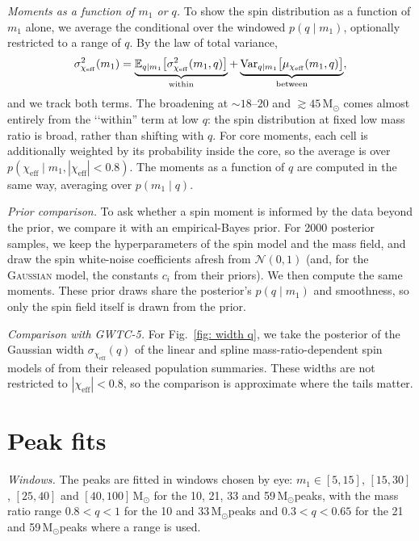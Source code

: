 \documentclass[%
 reprint,
 amsmath,amssymb,
 aps,
 prl,
 nofootinbib,nobibnotes,
 floatfix,
]{revtex4-2}
\newcommand{\Msun}{\ensuremath{\mathrm{M}_{\odot}}}
\newcommand{\chieff}{\ensuremath{\chi_{\mathrm{eff}}}}
\newcommand{\gaussianspins}{\textsc{Gaussian}\xspace}
\newcommand{\featTen}{10\xspace}
\newcommand{\featTwenty}{21\xspace}
\newcommand{\featThirtyFive}{33\xspace}
\newcommand{\featSixty}{59\xspace}
\begin{document}
\textit{Moments as a function of $m_1$ or $q$.} To show the spin distribution as a function of $m_1$ alone, we average the conditional over the windowed $p(q \mid m_1)$, optionally restricted to a range of $q$. By the law of total variance,
\begin{equation}
    \sigma^2_{\chieff}(m_1) = \underbrace{\mathbb{E}_{q \mid m_1}\big[\sigma^2_{\chieff}(m_1, q)\big]}_{\rm within} + \underbrace{\mathrm{Var}_{q \mid m_1}\big[\mu_{\chieff}(m_1, q)\big]}_{\rm between},
\end{equation}
and we track both terms. The broadening at $\sim 18$--$20$ and $\gtrsim 45\,\Msun$ comes almost entirely from the \lq\lq within'' term at low $q$: the spin distribution at fixed low mass ratio is broad, rather than shifting with $q$. For core moments, each cell is additionally weighted by its probability inside the core, so the average is over $p(\chieff \mid m_1, |\chieff| < 0.8)$. The moments as a function of $q$ are computed in the same way, averaging over $p(m_1 \mid q)$.

\textit{Prior comparison.} To ask whether a spin moment is informed by the data beyond the prior, we compare it with an empirical-Bayes prior. For 2000 posterior samples, we keep the hyperparameters of the spin model and the mass field, and draw the spin white-noise coefficients afresh from $\mathcal{N}(0, 1)$ (and, for the \gaussianspins model, the constants $c_i$ from their priors). We then compute the same moments. These prior draws share the posterior's $p(q \mid m_1)$ and smoothness, so only the spin field itself is drawn from the prior.

\textit{Comparison with \ac{GWTC-5}.} For Fig.~\ref{fig: width q}, we take the posterior of the Gaussian width $\sigma_{\chieff}(q)$ of the linear and spline mass-ratio-dependent spin models of \citet{LIGOScientific:2026ctl} from their released population summaries. These widths are not restricted to $|\chieff| < 0.8$, so the comparison is approximate where the tails matter.

\section{Peak fits}
\label{sm: peak fits}

\textit{Windows.} The peaks are fitted in windows chosen by eye: $m_1 \in [5, 15]$, $[15, 30]$, $[25, 40]$ and $[40, 100]\,\Msun$ for the \featTen, \featTwenty, \featThirtyFive and \featSixty\,\Msun peaks, with the mass ratio range $0.8 < q < 1$ for the \featTen and \featThirtyFive\,\Msun peaks and $0.3 < q < 0.65$ for the \featTwenty and \featSixty\,\Msun peaks where a range is used.
\end{document}
